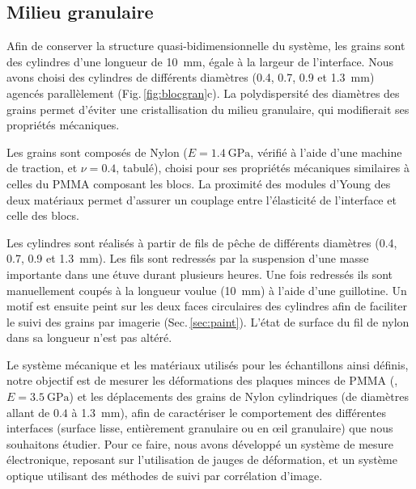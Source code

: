 \subsection{Milieu granulaire}


Afin de conserver la structure quasi-bidimensionnelle du système, les grains sont des cylindres d'une longueur de \SI{10}{\milli\meter}, égale à la largeur de l'interface. Nous avons choisi des cylindres de différents diamètres (0.4, 0.7, 0.9 et \SI{1.3}{\milli\meter}) agencés parallèlement (Fig.\,\ref{fig:blocgran}c). La polydispersité des diamètres des grains permet d'éviter une cristallisation du milieu granulaire, qui modifierait ses propriétés mécaniques.





Les grains sont composés de Nylon ($E=\SI{1.4}{\giga\pascal}$, vérifié à l'aide d'une machine de traction, et $\nu=0.4$, tabulé), choisi pour ses propriétés mécaniques similaires à celles du PMMA composant les blocs. La proximité des modules d'Young des deux matériaux permet d'assurer un couplage entre l'élasticité de l'interface et celle des blocs.

Les cylindres sont réalisés à partir de fils de pêche de différents diamètres (0.4, 0.7, 0.9 et \SI{1.3}{\milli\meter}). Les fils sont redressés par la suspension d'une masse importante dans une étuve durant plusieurs heures. Une fois redressés ils sont manuellement coupés à la longueur voulue (\SI{10}{\milli\meter}) à l'aide d'une
guillotine. Un motif est ensuite peint sur les deux faces circulaires des cylindres afin de faciliter le suivi des grains par imagerie (Sec.\,\ref{sec:paint}). L'état de surface du fil de nylon dans sa longueur n'est pas altéré.



Le système mécanique et les matériaux utilisés pour les échantillons ainsi définis, notre objectif est de mesurer les déformations des plaques minces de PMMA (, $E=\SI{3.5}{\giga\pascal}$) et les déplacements des grains de Nylon cylindriques (de diamètres allant de $0.4$ à \SI{1.3}{\mm}), afin de caractériser le comportement des différentes interfaces (surface lisse, entièrement granulaire ou en œil granulaire) que nous souhaitons étudier. Pour ce faire, nous avons développé un système de mesure électronique, reposant sur l'utilisation de jauges de déformation, et un système optique utilisant des méthodes de suivi par corrélation d'image.





